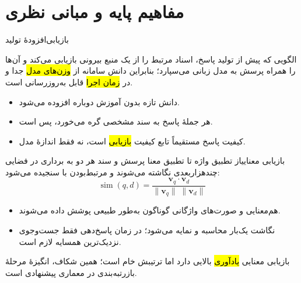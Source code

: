 \section{مفاهیم پایه و مبانی نظری}

\begin{frame}{بازیابی‌افزودهٔ تولید}{}
  \begin{PTdef}[\en{RAG}]
    الگویی که پیش از تولید پاسخ، اسناد مرتبط را از یک منبع بیرونی بازیابی می‌کند
    و آن‌ها را همراه پرسش به مدل زبانی می‌سپارد؛ بنابراین دانش سامانه از
    \hl{وزن‌های مدل} جدا و در \hl{زمان اجرا} قابل به‌روزرسانی است.
  \end{PTdef}

  \begin{itemize}
    \item دانش تازه بدون آموزش دوباره افزوده می‌شود.
    \item هر جملهٔ پاسخ به سند مشخصی گره می‌خورد، پس  است.
    \item کیفیت پاسخ مستقیماً تابع کیفیت \hl{بازیابی} است، نه فقط اندازهٔ مدل.
  \end{itemize}
\end{frame}

\begin{frame}{بازیابی معنایی}{از تطبیق واژه تا تطبیق معنا}
  پرسش و سند هر دو به برداری در فضایی چندهزار‌بعدی نگاشته می‌شوند و مرتبط‌بودن با
   سنجیده می‌شود:
  \[
    \operatorname{sim}(q,d)=
      \frac{\mathbf{v}_q\cdot\mathbf{v}_d}
           {\lVert\mathbf{v}_q\rVert\;\lVert\mathbf{v}_d\rVert}
  \]

  \begin{itemize}
    \item هم‌معنایی و صورت‌های واژگانی گوناگون به‌طور طبیعی پوشش داده می‌شوند.
    \item نگاشت یک‌بار محاسبه و نمایه می‌شود؛ در زمان پاسخ‌دهی فقط جست‌وجوی
          نزدیک‌ترین همسایه لازم است.
  \end{itemize}

  \begin{PTnote}
    بازیابی معنایی \hl{یادآوری} بالایی دارد اما ترتیبش خام است؛ همین شکاف، انگیزهٔ
    مرحلهٔ بازرتبه‌بندی در معماری پیشنهادی است.
  \end{PTnote}
\end{frame}

